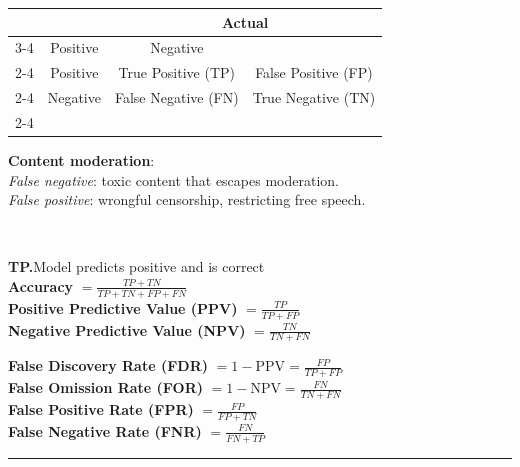 \documentclass[8pt, a4paper]{extarticle}
\makeatletter
\renewcommand{\hline}{\noalign{\vskip 2px}\hrule\@height\arrayrulewidth\@width\linewidth\noalign{\vskip 2px}}
\makeatother
\begin{document}
\begin{minipage}[t]{0.49\textwidth}
{\begin{minipage}[t]{1\textwidth}
\begin{minipage}[htp]{0.999\textwidth}
\begin{minipage}[htp]{0.65\textwidth}
					\begin{tabular}{cc|c|c|}
						\multicolumn{2}{c}{}  & \multicolumn{2}{c}{\textbf{Actual}}                                             \\
						\cline{3-4}
						\multicolumn{2}{c|}{} & Positive                            & Negative                                  \\
						\cline{2-4}
						                      & Positive                            & True Positive (TP)  & False Positive (FP) \\
						\cline{2-4}
						                      & Negative                            & False Negative (FN) & True Negative (TN)  \\
						\cline{2-4}
					\end{tabular}
				\end{minipage}\hfill
				\begin{minipage}[htp]{0.33\textwidth}
					\textbf{Content moderation}:\\
					\textit{False negative}: toxic content that escapes moderation.\\
					\textit{False positive}: wrongful censorship, restricting free speech.
				\end{minipage}
			\end{minipage}\\
			\begin{minipage}[htp]{0.5\textwidth}
				\textbf{TP.}Model predicts positive and is correct\\
				\textbf{Accuracy}                        $= \frac{TP + TN}{TP + TN + FP + FN}  $\\
				\textbf{Positive Predictive Value (PPV)} $= \frac{TP}{TP + FP}                 $\\
				\textbf{Negative Predictive Value (NPV)} $= \frac{TN}{TN + FN}                 $
			\end{minipage}
			\begin{minipage}[htp]{0.5\textwidth}
				\textbf{False Discovery Rate (FDR)}      $= 1 - \text{PPV} = \frac{FP}{TP + FP}$\\
				\textbf{False Omission Rate (FOR)}       $= 1 - \text{NPV} = \frac{FN}{TN + FN}$\\
				\textbf{False Positive Rate (FPR)}       $= \frac{FP}{FP + TN}                 $\\
				\textbf{False Negative Rate (FNR)}       $= \frac{FN}{FN + TP}$
			\end{minipage}\hline
			\begin{minipage}[t]{0.5\textwidth}

\end{minipage}
\end{minipage}}
\end{minipage}
\end{document}
